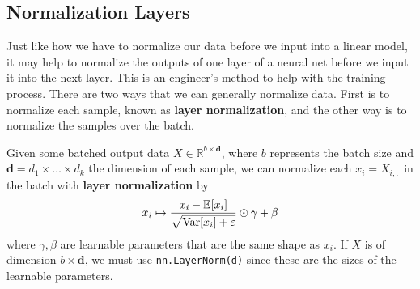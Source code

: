 \subsection{Normalization Layers} 

  Just like how we have to normalize our data before we input into a linear model, it may help to normalize the outputs of one layer of a neural net before we input it into the next layer. This is an engineer's method to help with the training process. There are two ways that we can generally normalize data. First is to normalize each sample, known as \textbf{layer normalization}, and the other way is to normalize the samples over the batch. 

  \begin{definition}
    Given some batched output data $X \in \mathbb{R}^{b \times \mathbf{d}}$, where $b$ represents the batch size and $\mathbf{d} = d_1 \times \ldots \times d_k$ the dimension of each sample, we can normalize each $x_i = X_{i, :}$ in the batch with \textbf{layer normalization} by 
    \begin{equation}
      x_i \mapsto \frac{x_i - \mathbb{E}[x_i]}{\sqrt{\operatorname{Var}[x_i] + \varepsilon}} \odot \gamma + \beta
    \end{equation}
    where $\gamma, \beta$ are learnable parameters that are the same shape as $x_i$. If $X$ is of dimension $b \times \mathbf{d}$, we must use \texttt{nn.LayerNorm(d)} since these are the sizes of the learnable parameters. 
  \end{definition}

